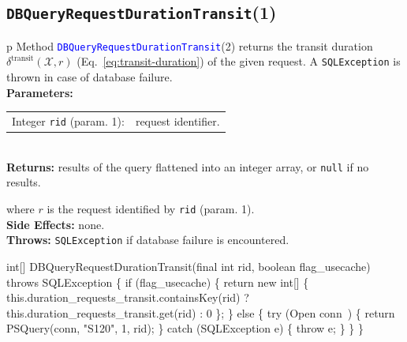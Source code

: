 \subsection{\texttt{DBQueryRequestDurationTransit}(1)}
\begin{tabular}{p{\textwidth}}
\toprule
{}
Method \textcolor{blue}{{\tt{}\protect{}DBQueryRequestDurationTransit}}(2) returns the
transit duration $\delta^\textrm{transit}(\mathcal{X},r)$
(Eq.~\ref{eq:transit-duration}) of the given request.
A {\tt{}SQLException} is thrown in case of database failure.\\
\midrule
\textbf{Parameters:}\\
\begin{tabular}{lp{116mm}}
Integer {\tt{}rid} (param. 1):&request identifier.
\end{tabular}\\
\textbf{Returns:} results of the query flattened into an integer array,
or {\tt{}null} if no results.


where $r$ is the request identified by {\tt{}rid} (param. 1).\\
\textbf{Side Effects:} none.\\
\textbf{Throws:} {\tt{}SQLException} if database failure is encountered.\\
\bottomrule
\end{tabular}
\nwenddocs{}\endmoddef{}
int[] DBQueryRequestDurationTransit(final int rid, boolean flag_usecache) throws SQLException \{
  if (flag_usecache) \{
    return new int[] \{ this.duration_requests_transit.containsKey(rid)
        ? this.duration_requests_transit.get(rid)
        : 0 \};
  \} else \{
    try (\LA{}Open \code{}conn\edoc{}~{\nwtagstyle{}}\RA{}) \{
      return PSQuery(conn, "S120", 1, rid);
    \} catch (SQLException e) \{
      throw e;
    \}
  \}
\}
\eatline
{}\nwendcode{}\nwdocspar
